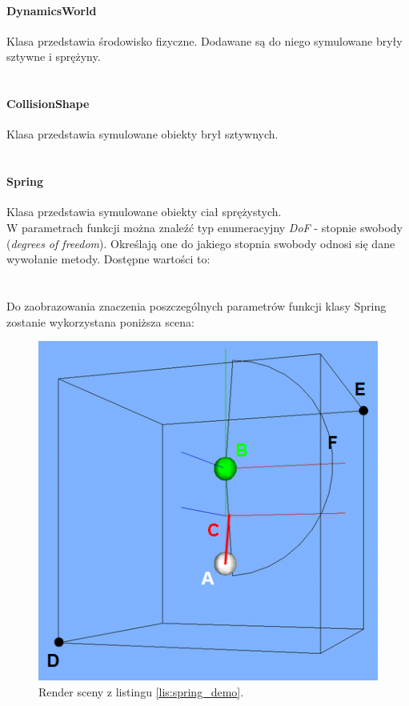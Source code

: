 \paragraph{DynamicsWorld}
Klasa przedstawia środowisko fizyczne. Dodawane są do niego symulowane bryły
sztywne i sprężyny.\\ \\


\paragraph{CollisionShape}
Klasa przedstawia symulowane obiekty brył sztywnych.\\ \\


\paragraph{Spring}
Klasa przedstawia symulowane obiekty ciał sprężystych.\\
W parametrach funkcji można znaleźć typ enumeracyjny \emph{DoF} -
stopnie swobody (\emph{degrees of freedom}). Określają one do jakiego stopnia
swobody odnosi się dane wywołanie metody. Dostępne wartości to:\\

\\ \\
Do zaobrazowania znaczenia poszczególnych parametrów funkcji klasy Spring
zostanie wykorzystana poniższa scena:\\



\begin{figure}
\centering
\includegraphics[scale = 0.6]{./img/Spring-render.png}
\caption{Render sceny z listingu \ref{lis:spring_demo}.}
\label{fig:spring_demo}
\end{figure}

